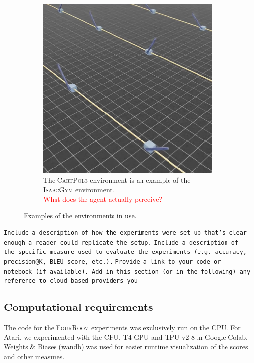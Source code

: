 \documentclass[10pt]{article} %
\begin{document}
\begin{figure}
\begin{subfigure}[b]{0.32\textwidth}
    \includegraphics[width=\textwidth]{figures/isaac.png}
    \caption{The \textsc{CartPole} environment is an example of the \textsc{IsaacGym} environment.\\\textcolor{red}{What does the agent actually perceive?}\\}
    \label{fig:sample-env-isaac}
  \end{subfigure}
  \caption{Examples of the environments in use.}
  \label{fig:environmnents}
\end{figure}



\texttt{Include a description of how the experiments were set up that's clear enough a reader could replicate the setup.}
\texttt{Include a description of the specific measure used to evaluate the experiments (e.g. accuracy, precision@K, BLEU score, etc.).}
\texttt{Provide a link to your code or notebook (if available). Add in this section (or in the following) any reference to cloud-based providers you}

\hypertarget{computational-requirements}{\subsection{Computational requirements}}

\noindent The code for the \textsc{FourRoom} experiments was exclusively run on the CPU. For Atari, we experimented with the CPU, T4 GPU and TPU v2-8 in Google Colab. Weights \& Biases (wandb) was used for easier runtime visualization of the scores and other measures.
\end{document}
